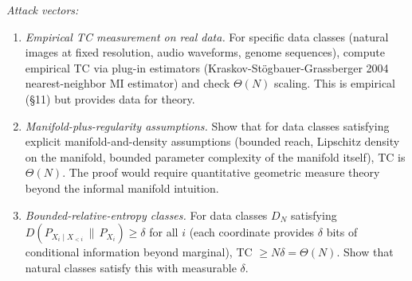 \documentclass[
]{article}
\begin{document}
\emph{Attack vectors:}
\begin{enumerate}
\item \emph{Empirical TC measurement on real data.} For specific
data classes (natural images at fixed resolution, audio waveforms,
genome sequences), compute empirical TC via plug-in estimators
(Kraskov-Stögbauer-Grassberger 2004 nearest-neighbor MI estimator)
and check $\Theta(N)$ scaling. This is empirical (§11) but provides
data for theory.
\item \emph{Manifold-plus-regularity assumptions.} Show that for
data classes satisfying explicit manifold-and-density assumptions
(bounded reach, Lipschitz density on the manifold, bounded
parameter complexity of the manifold itself), TC is $\Theta(N)$.
The proof would require quantitative geometric measure theory
beyond the informal manifold intuition.
\item \emph{Bounded-relative-entropy classes.} For data classes
$D_N$ satisfying $D(P_{X_i \mid X_{<i}} \,\|\, P_{X_i}) \geq \delta$
for all $i$ (each coordinate provides $\delta$ bits of conditional
information beyond marginal), TC $\geq N \delta = \Theta(N)$. Show
that natural classes satisfy this with measurable $\delta$.
\end{enumerate}
\end{document}
